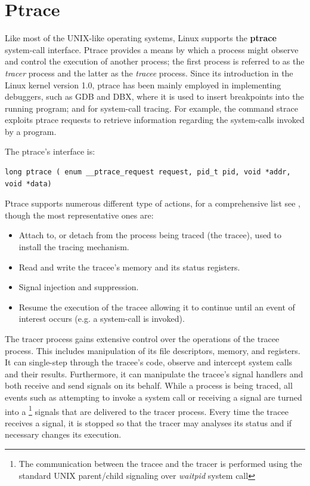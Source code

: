 \chapter{Ptrace}

Like most of the UNIX-like operating systems, Linux supports the \textbf{ptrace} system-call interface. Ptrace provides a means by which a process might observe and control the execution of another process; the first process is referred to as the \textit{tracer} process and the latter as the \textit{tracee} process. Since its introduction in the Linux kernel version 1.0,  ptrace has been mainly employed in implementing debuggers, such as GDB and DBX, where it is used to insert breakpoints into the running program; and for system-call tracing. For example, the command strace exploits ptrace requests to retrieve information regarding the system-calls invoked by a program. 

The ptrace's interface is:
\begin{center}
\lstset{escapechar=@,style=c}
\begin{lstlisting}[caption={Synopsis ptrace system call}]
					long ptrace ( enum __ptrace_request request, pid_t pid, void *addr, void *data)
\end{lstlisting}
\end{center}

Ptrace supports numerous different type of actions, for a comprehensive list see  \cite{ptrace}, though the most representative ones are:

\begin{itemize}
\item Attach to, or detach from the process being traced (the tracee), used to install the tracing mechanism.  
\item Read and write the tracee's memory and its status registers.
\item Signal injection and suppression.
\item Resume the execution of the tracee allowing it to continue until 
	  an event of interest occurs (e.g. a system-call is invoked).
\end{itemize} 

The tracer process gains extensive control over the operations of the tracee process. This includes manipulation of its file descriptors, memory, and registers. It can single-step through the tracee's code, observe and intercept system calls and their results. Furthermore, it can manipulate the tracee's signal handlers and both receive and send signals on its behalf. While a process is being traced, all events such as attempting to invoke a system call or receiving a signal are turned into a   \footnote{The communication between the tracee and the tracer is performed using the standard UNIX parent/child signaling over \emph{waitpid} system call}  signals that are delivered to the tracer process. Every time the tracee receives a signal, it is stopped so that the tracer may analyses its status and if necessary changes its execution. 


